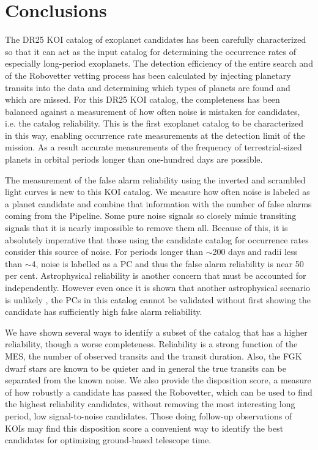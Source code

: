 

\section{Conclusions}

The DR25 KOI catalog of exoplanet candidates has been carefully characterized so that it can act as the input catalog for determining the occurrence rates of especially long-period exoplanets. The detection efficiency of the entire search \citep{Burke2017b,Christiansen2017} and of the Robovetter vetting process has been calculated by injecting planetary transits into the data and determining which types of planets are found and which are missed. For this DR25 KOI catalog, the completeness has been balanced against a measurement of how often noise is mistaken for candidates, i.e. the catalog reliability. This is the first exoplanet catalog to be characterized in this way, enabling occurrence rate measurements at the detection limit of the mission.  As a result accurate measurements of the frequency of terrestrial-sized planets in orbital periods longer than one-hundred days are possible.

The measurement of the false alarm reliability using the inverted and scrambled light curves is new to this KOI catalog. We measure how often noise is labeled as a planet candidate and combine that information with the number of false alarms coming from the \Kepler{} Pipeline. Some pure noise signals so closely mimic transiting signals that it is nearly impossible to remove them all. Because of this, it is absolutely imperative that those using the candidate catalog for occurrence rates consider this source of noise. For periods longer than $\sim$200 days and radii less than $\sim$4\Rearth, noise is labelled as a PC and thus the false alarm reliability is near 50 per cent.  Astrophysical reliability is another concern that must be accounted for independently.  However even once it is shown that another astrophysical scenario is unlikely \citep[as was done for the DR24 KOIs in ][]{Morton2017}, the PCs in this catalog cannot be validated without first showing the candidate has sufficiently high false alarm reliability. 

We have shown several ways to identify a subset of the catalog that has a higher reliability, though a worse completeness. Reliability is a strong function of the MES, the number of observed transits and the transit duration. Also, the FGK dwarf stars are known to be quieter and in general the true transits can be separated from the known noise. We also provide the disposition score, a measure of how robustly a candidate has passed the Robovetter, which can be used to find the highest reliability candidates, without removing the most interesting long period, low signal-to-noise candidates. Those doing follow-up observations of KOIs may find this disposition score a convenient way to identify the best candidates for optimizing ground-based telescope time.

